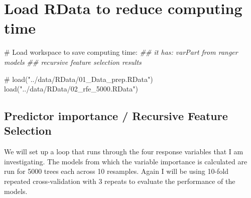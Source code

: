 \documentclass[
  letterpaper,
  DIV=11,
  numbers=noendperiod]{scrreprt}
\newenvironment{Shaded}{\begin{snugshade}}{\end{snugshade}}
\newcommand{\CommentTok}[1]{\textcolor[rgb]{0.37,0.37,0.37}{#1}}
\newcommand{\DocumentationTok}[1]{\textcolor[rgb]{0.37,0.37,0.37}{\textit{#1}}}
\newcommand{\FunctionTok}[1]{\textcolor[rgb]{0.28,0.35,0.67}{#1}}
\newcommand{\NormalTok}[1]{\textcolor[rgb]{0.00,0.23,0.31}{#1}}
\newcommand{\StringTok}[1]{\textcolor[rgb]{0.13,0.47,0.30}{#1}}
\begin{document}
\section{Load RData to reduce computing time}

\begin{Shaded}
\begin{Highlighting}[]
\CommentTok{\# Load workspace to save computing time:}
\DocumentationTok{\#\# it has: varPart from ranger models}
\DocumentationTok{\#\# recursive feature selection results}

\CommentTok{\# load("../data/RData/01\_Data\_prep.RData")}
\FunctionTok{load}\NormalTok{(}\StringTok{"../data/RData/02\_rfe\_5000.RData"}\NormalTok{)}
\end{Highlighting}
\end{Shaded}

\subsection{Predictor importance / Recursive Feature
Selection}\label{predictor-importance-recursive-feature-selection}

We will set up a loop that runs through the four response variables that
I am investigating. The models from which the variable importance is
calculated are run for 5000 trees each across 10 resamples. Again I will
be using 10-fold repeated cross-validation with 3 repeats to evaluate
the performance of the models.
\end{document}
